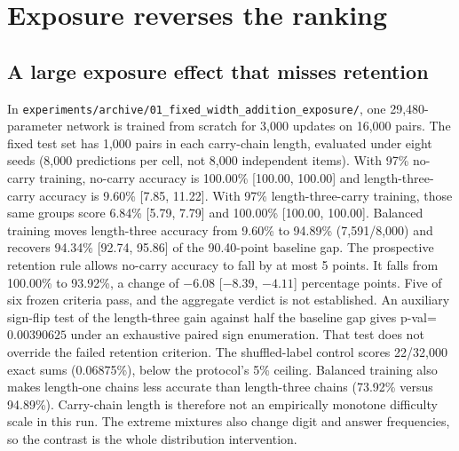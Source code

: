 \section{Exposure reverses the ranking}
\label{sec:ranking}

\subsection{A large exposure effect that misses retention}
\label{sec:exp01}
In \texttt{experiments/archive/01\_fixed\_width\_addition\_exposure/}, one 29{,}480-parameter network is trained from scratch for 3{,}000 updates on 16{,}000 pairs.
The fixed test set has 1{,}000 pairs in each carry-chain length, evaluated under eight seeds (8{,}000 predictions per cell, not 8{,}000 independent items).
With 97\% no-carry training, no-carry accuracy is 100.00\% [100.00, 100.00] and length-three-carry accuracy is 9.60\% [7.85, 11.22].
With 97\% length-three-carry training, those same groups score 6.84\% [5.79, 7.79] and 100.00\% [100.00, 100.00].
Balanced training moves length-three accuracy from 9.60\% to 94.89\% (7{,}591/8{,}000) and recovers 94.34\% [92.74, 95.86] of the 90.40-point baseline gap.
The prospective retention rule allows no-carry accuracy to fall by at most 5 points.
It falls from 100.00\% to 93.92\%, a change of $-6.08$ [$-8.39$, $-4.11$] percentage points.
Five of six frozen criteria pass, and the aggregate verdict is not established.
An auxiliary sign-flip test of the length-three gain against half the baseline gap gives p-val=$0.00390625$ under an exhaustive paired sign enumeration.
That test does not override the failed retention criterion.
The shuffled-label control scores 22/32{,}000 exact sums (0.06875\%), below the protocol's 5\% ceiling.
Balanced training also makes length-one chains less accurate than length-three chains (73.92\% versus 94.89\%).
Carry-chain length is therefore not an empirically monotone difficulty scale in this run.
The extreme mixtures also change digit and answer frequencies, so the contrast is the whole distribution intervention.

